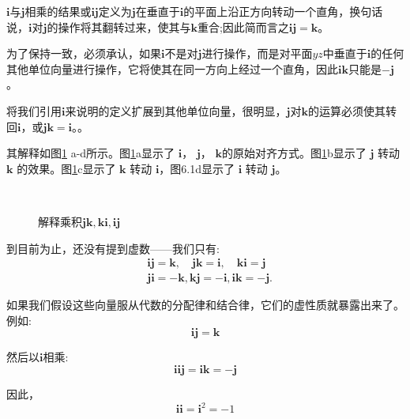 \begin{CJK}{UTF8}{gkai}
    $\mathbf{i}$与$\mathbf{j}$相乘的结果或$\mathbf{ij}$定义为$\mathbf{j}$在垂直于$\mathbf{i}$的平面上沿正方向转动一个直角，换句话说，$\mathbf{i}$对$\mathbf{j}$的操作将其翻转过来，使其与$\mathbf{k}$重合;因此简而言之$\mathbf{i} \mathbf{j}=\mathbf{k}$。

    为了保持一致，必须承认，如果$\mathbf{i}$不是对$\mathbf{j}$进行操作，而是对平面$y z$中垂直于$\mathbf{i}$的任何其他单位向量进行操作，它将使其在同一方向上经过一个直角，因此$\mathbf{i k}$只能是$-\mathbf{j}$。

    将我们引用$\mathbf{i}$来说明的定义扩展到其他单位向量，很明显，$\mathbf{j}$对$\mathbf{k}$的运算必须使其转回$\mathbf{i}$，或$\mathbf{j} \mathbf{k}=\mathbf{i}$。。\cite{bib6-4}
\end{CJK}

其解释如图\ref{fig:6-1} a-d所示。图\ref{fig:6-1}a显示了 $\mathbf{i}$， $\mathbf{j}$， $\mathbf{k}$的原始对齐方式。图\ref{fig:6-1}b显示了 $\mathbf{j}$ 转动 $\mathbf{k}$ 的效果。图\ref{fig:6-1}c显示了 $\mathbf{k}$ 转动 $\mathbf{i}$，图6.1d显示了 $\mathbf{i}$ 转动 $\mathbf{j}$。

\begin{figure}[htbp]
    \centering
    \\
    \caption[short]{ 解释乘积$\mathbf{j k,  ki, ij}$}
    \label{fig:6-1}
\end{figure}


到目前为止，还没有提到虚数——我们只有:
$$
    \begin{aligned}
         & \mathbf{i j}=\mathbf{k}, \quad \mathbf{j k}=\mathbf{i}, \quad \mathbf{k i}=\mathbf{j} \\
         & \mathbf{j i}=-\mathbf{k}, \mathbf{k j}=-\mathbf{i}, \mathbf{i k}=-\mathbf{j} .
    \end{aligned}
$$

如果我们假设这些向量服从代数的分配律和结合律，它们的虚性质就暴露出来了。例如:
$$
    \mathbf{i j}=\mathbf{k}
$$

然后以$\mathbf{i}$相乘:
$$
    \mathbf{i i j}=\mathbf{i k}=-\mathbf{j}
$$

因此，
$$
    \mathbf{i i}=\mathbf{i}^{2}=-1
$$

